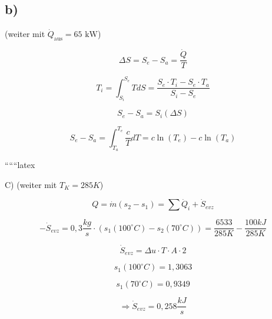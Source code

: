 

\subsection*{b)}

(weiter mit \(\dot{Q}_{\text{aus}} = 65 \text{ kW}\))

\[
\Delta S = S_e - S_a = \frac{\dot{Q}}{T}
\]

\[
T_i = \int_{S_i}^{S_e} T dS = \frac{S_e \cdot T_i - S_e \cdot T_a}{S_i - S_e}
\]

\[
S_e - S_a = S_i \left( \Delta S \right)
\]

\[
S_e - S_a = \int_{T_a}^{T_e} \frac{c}{T} dT = c \ln \left( T_e \right) - c \ln \left( T_a \right)
\]

``````latex


C) (weiter mit $T_K = 285K$)

\[
Q = \dot{m}(s_2 - s_1) = \sum \dot{Q}_i + \dot{S}_{evz}
\]

\[
- \dot{S}_{evz} = 0,3 \frac{kg}{s} \cdot (s_1(100^\circ C) - s_2(70^\circ C)) = \frac{6533}{285K} - \frac{100kJ}{285K}
\]

\[
\dot{S}_{evz} = \Delta u \cdot T \cdot A \cdot 2
\]

\[
s_1(100^\circ C) = 1,3063
\]

\[
s_1(70^\circ C) = 0,9349
\]

\[
\Rightarrow \dot{S}_{evz} = 0,258 \frac{kJ}{s}
\]